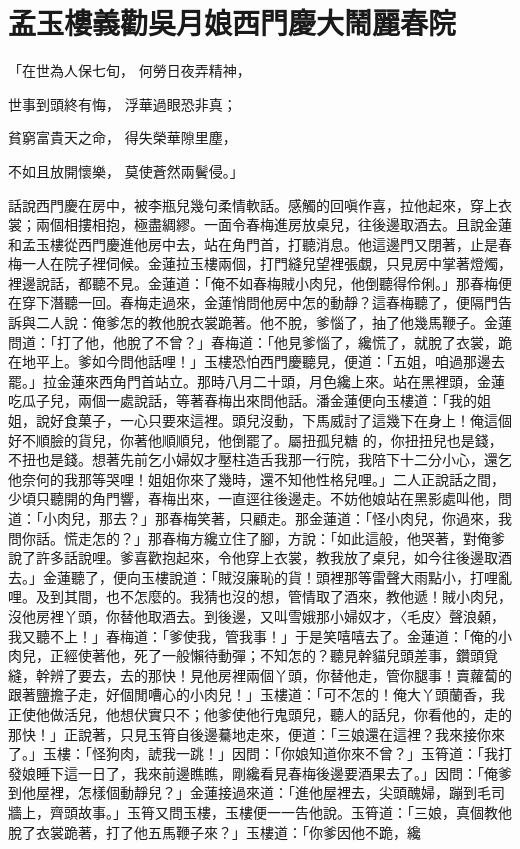 %

\chapter{孟玉樓義勸吳月娘\KG 西門慶大鬧麗春院}

「在世為人保七旬，  何勞日夜弄精神，

世事到頭終有悔，  浮華過眼恐非真；

貧窮富貴天之命，  得失榮華隙里塵，

不如且放開懷樂，  莫使蒼然兩鬢侵。」

話說西門慶在房中，被李瓶兒幾句柔情軟話。感觸的回嗔作喜，拉他起來，穿上衣裳；兩個相摟相抱，極盡綢繆。一面令春梅進房放桌兒，往後邊取酒去。且說金蓮和孟玉樓從西門慶進他房中去，站在角門首，打聽消息。他這邊門又閉著，止是春梅一人在院子裡伺候。金蓮拉玉樓兩個，打門縫兒望裡張覷，只見房中掌著燈燭，裡邊說話，都聽不見。金蓮道：「俺不如春梅賊小肉兒，他倒聽得伶俐。」那春梅便在穿下潛聽一回。春梅走過來，金蓮悄問他房中怎的動靜？這春梅聽了，便隔門告訴與二人說：俺爹怎的教他脫衣裳跪著。他不脫，爹惱了，抽了他幾馬鞭子。金蓮問道：「打了他，他脫了不曾？」春梅道：「他見爹惱了，纔慌了，就脫了衣裳，跪在地平上。爹如今問他話哩！」玉樓恐怕西門慶聽見，便道：「五姐，咱過那邊去罷。」拉金蓮來西角門首站立。那時八月二十頭，月色纔上來。站在黑裡頭，金蓮吃瓜子兒，兩個一處說話，等著春梅出來問他話。潘金蓮便向玉樓道：「我的姐姐，說好食菓子，一心只要來這裡。頭兒沒動，下馬威討了這幾下在身上！俺這個好不順臉的貨兒，你著他順順兒，他倒罷了。屬扭孤兒糖 的，你扭扭兒也是錢，不扭也是錢。想著先前乞小婦奴才壓柱造舌我那一行院，我陪下十二分小心，還乞他奈何的我那等哭哩！姐姐你來了幾時，還不知他性格兒哩。」二人正說話之間，少頃只聽開的角門響，春梅出來，一直逕往後邊走。不妨他娘站在黑影處叫他，問道：「小肉兒，那去？」那春梅笑著，只顧走。那金蓮道：「怪小肉兒，你過來，我問你話。慌走怎的？」那春梅方纔立住了腳，方說：「如此這般，他哭著，對俺爹說了許多話說哩。爹喜歡抱起來，令他穿上衣裳，教我放了桌兒，如今往後邊取酒去。」金蓮聽了，便向玉樓說道：「賊沒廉恥的貨！頭裡那等雷聲大雨點小，打哩亂哩。及到其間，也不怎麼的。我猜也沒的想，管情取了酒來，教他遞！賊小肉兒，沒他房裡丫頭，你替他取酒去。到後邊，又叫雪娥那小婦奴才，〈毛皮〉聲浪顙，我又聽不上！」春梅道：「爹使我，管我事！」于是笑嘻嘻去了。金蓮道：「俺的小肉兒，正經使著他，死了一般懶待動彈；不知怎的？聽見幹貓兒頭差事，鑽頭覓縫，幹辨了要去，去的那快！見他房裡兩個丫頭，你替他走，管你腿事！賣蘿蔔的跟著鹽擔子走，好個閒嘈心的小肉兒！」玉樓道：「可不怎的！俺大丫頭蘭香，我正使他做活兒，他想伏實只不；他爹使他行鬼頭兒，聽人的話兒，你看他的，走的那快！」正說著，只見玉筲自後邊驀地走來，便道：「三娘還在這裡？我來接你來了。」玉樓：「怪狗肉，諕我一跳！」因問：「你娘知道你來不曾？」玉筲道：「我打發娘睡下這一日了，我來前邊瞧瞧，剛纔看見春梅後邊要酒果去了。」因問：「俺爹到他屋裡，怎樣個動靜兒？」金蓮接過來道：「進他屋裡去，尖頭醜婦，蹦到毛司牆上，齊頭故事。」玉筲又問玉樓，玉樓便一一告他說。玉筲道：「三娘，真個教他脫了衣裳跪著，打了他五馬鞭子來？」玉樓道：「你爹因他不跪，纔